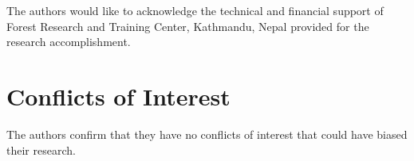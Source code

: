\documentclass[preprint, 3p,
authoryear]{elsarticle} %
\begin{document}
The authors would like to acknowledge the technical and financial
support of Forest Research and Training Center, Kathmandu, Nepal
provided for the research accomplishment.

\hypertarget{conflicts-of-interest}{%
\section{Conflicts of Interest}\label{conflicts-of-interest}}

The authors confirm that they have no conflicts of interest that could
have biased their research.


\end{document}
